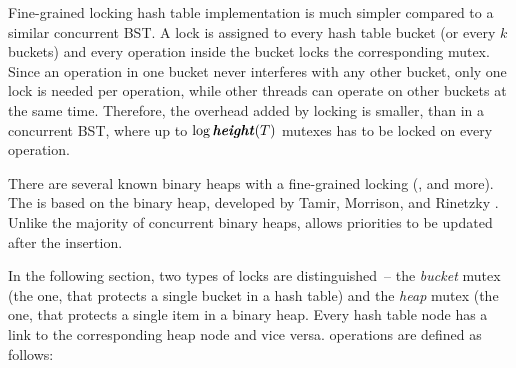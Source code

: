 Fine-grained locking hash table implementation is much simpler compared to a similar concurrent BST. A lock is assigned to every hash table bucket (or every $k$ buckets) and every operation inside the bucket locks the corresponding mutex. Since an operation in one bucket never interferes with any other bucket, only one lock is needed per operation, while other threads can operate on other buckets at the same time. Therefore, the overhead added by locking is smaller, than in a concurrent BST, where up to $\log{\ensuremath{\textbf{\textit{height}}(T)}}$ mutexes has to be locked on every operation.

There are several known binary heaps with a fine-grained locking (\cite{concurrent_heap1}, \cite{champ} and more). The \cndcname is based on the  binary heap, developed by Tamir, Morrison, and Rinetzky \cite{champ}. Unlike the majority of concurrent binary heaps,  allows priorities to be updated after the insertion.

In the following section, two types of locks are distinguished~-- the \emph{bucket} mutex (the one, that protects a single bucket in a hash table) and the \emph{heap} mutex (the one, that protects a single item in a binary heap. Every hash table node has a link to the corresponding heap node and vice versa. \cndcname operations are defined as follows:


